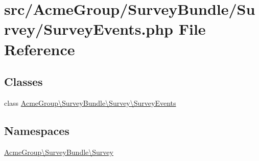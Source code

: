\hypertarget{_survey_events_8php}{\section{src/\+Acme\+Group/\+Survey\+Bundle/\+Survey/\+Survey\+Events.php File Reference}
\label{_survey_events_8php}
}
\subsection*{Classes}
\begin{DoxyCompactItemize}
\item 
class \hyperlink{class_acme_group_1_1_survey_bundle_1_1_survey_1_1_survey_events}{Acme\+Group\textbackslash{}\+Survey\+Bundle\textbackslash{}\+Survey\textbackslash{}\+Survey\+Events}
\end{DoxyCompactItemize}
\subsection*{Namespaces}
\begin{DoxyCompactItemize}
\item 
 \hyperlink{namespace_acme_group_1_1_survey_bundle_1_1_survey}{Acme\+Group\textbackslash{}\+Survey\+Bundle\textbackslash{}\+Survey}
\end{DoxyCompactItemize}
